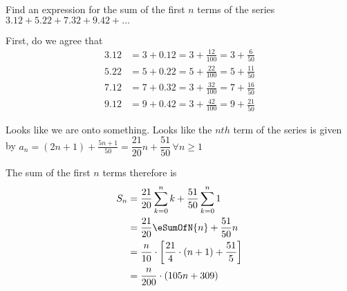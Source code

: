 
%
%
%
%
% 
% 

\question Find an expression for the sum of the first $n$ terms of the series 
$3.12 + 5.22 + 7.32 + 9.42 + \ldots$

\insertQR{}

\ifprintanswers
\fi 

\begin{solution}
	First, do we agree that
	\begin{align}
		3.12 &= 3 + 0.12 = 3 + \frac{12}{100} = 3 + \frac{6}{50} \\
		5.22 &= 5 + 0.22 = 5 + \frac{22}{100} = 5 + \frac{11}{50} \\
		7.12 &= 7 + 0.32 = 3 + \frac{32}{100} = 7 + \frac{16}{50} \\
		9.12 &= 9 + 0.42 = 3 + \frac{42}{100} = 9 + \frac{21}{50}
	\end{align}
	
	Looks like we are onto something. Looks like the $nth$ term of the series
	is given by $a_n = (2n+1) + \frac{5n+1}{50} = \dfrac{21}{20}n + \dfrac{51}{50}\, \forall n \geq 1$
	
	The sum of the first $n$ terms therefore is
	\begin{align}
		S_n &= \dfrac{21}{20}\sum_{k=0}^{n}k + \dfrac{51}{50}\sum_{k=0}^{n}1 \\
		&= \dfrac{21}{20}\eSumOfN{n} + \dfrac{51}{50}n \\
		&= \dfrac{n}{10}\cdot\left[ \dfrac{21}{4}\cdot(n+1) + \dfrac{51}{5}\right] \\
		&= \dfrac{n}{200}\cdot(105n + 309)
	\end{align}
\end{solution}
